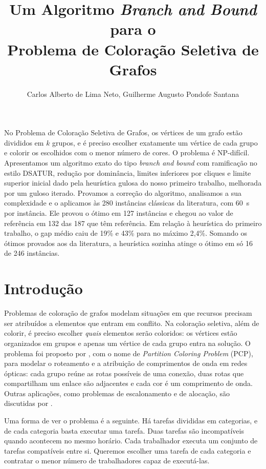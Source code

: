 \documentclass[12pt]{article}
\title{Um Algoritmo \emph{Branch and Bound} para o\\
  Problema de Coloração Seletiva de Grafos}
\author{Carlos Alberto de Lima Neto, Guilherme Augusto Pondofe Santana}
\begin{document}
\maketitle

\begin{resumo}
  No Problema de Coloração Seletiva de Grafos, os vértices de um grafo estão
  divididos em $k$ grupos, e é preciso escolher exatamente um vértice de cada
  grupo e colorir os escolhidos com o menor número de cores. O problema é
  NP-difícil. Apresentamos um algoritmo exato do tipo \emph{branch and bound}
  com ramificação no estilo DSATUR, redução por dominância, limites inferiores
  por cliques e limite superior inicial dado pela heurística gulosa do nosso
  primeiro trabalho, melhorada por um guloso iterado. Provamos a correção do
  algoritmo, analisamos a sua complexidade e o aplicamos às 280 instâncias
  clássicas da literatura, com 60~s por instância. Ele provou o ótimo em 127
  instâncias e chegou ao valor de referência em 132 das 187 que têm
  referência. Em relação à heurística do primeiro trabalho, o gap médio caiu
  de 19\% e 43\% para no máximo 2,4\%. Somando os ótimos provados aos da
  literatura, a heurística sozinha atinge o ótimo em só 16 de 246 instâncias.
\end{resumo}

\section{Introdução}

Problemas de coloração de grafos modelam situações em que recursos precisam
ser atribuídos a elementos que entram em conflito. Na coloração seletiva, além
de colorir, é preciso escolher \emph{quais} elementos serão coloridos: os
vértices estão organizados em grupos e apenas um vértice de cada grupo entra na
solução. O problema foi proposto por \cite{li2000}, com o nome de
\emph{Partition Coloring Problem} (PCP), para modelar o roteamento e a
atribuição de comprimentos de onda em redes ópticas: cada grupo reúne as rotas
possíveis de uma conexão, duas rotas que compartilham um enlace são adjacentes
e cada cor é um comprimento de onda. Outras aplicações, como problemas de
escalonamento e de alocação, são discutidas por \cite{demange2015}.

Uma forma de ver o problema é a seguinte. Há tarefas divididas em categorias, e
de cada categoria basta executar uma tarefa. Duas tarefas são incompatíveis
quando acontecem no mesmo horário. Cada trabalhador executa um conjunto de
tarefas compatíveis entre si. Queremos escolher uma tarefa de cada categoria e
contratar o menor número de trabalhadores capaz de executá-las.
\end{document}
